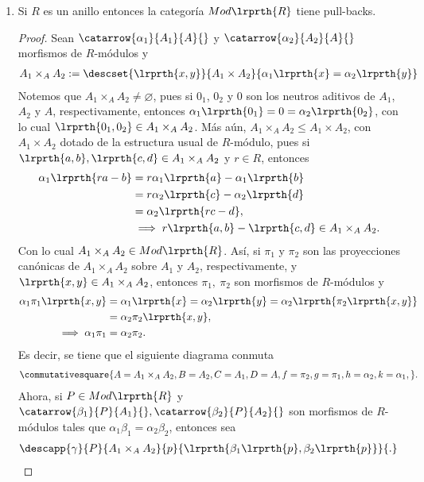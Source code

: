 \documentclass{article}
\begin{document}
\begin{enumerate}[label=\textbf{Ej \arabic*.}]
		\item Si $R$ es un anillo entonces la categoría $Mod\lrprth{R}$ tiene pull-backs.
		\begin{proof}
			Sean $\catarrow{\alpha_1}{A_1}{A}{}$ y $\catarrow{\alpha_2}{A_2}{A}{}$ morfismos de $R$-módulos y
			\begin{align*}
				A_1\times_{A} A_2:=\descset{\lrprth{x,y}}{A_1\times A_2}{\alpha_1\lrprth{x}=\alpha_2\lrprth{y}}
			\end{align*}
			\renewcommand{\copyandpaste}{A_1\times_{A} A_2}
			Notemos que $\copyandpaste\neq\varnothing$, pues si $0_1$, $0_2$ y $0$ son los neutros aditivos de $A_1$, $A_2$ y $A$, respectivamente, entonces $\alpha_1\lrprth{0_1}=0=\alpha_2\lrprth{0_2}$, con lo cual $\lrprth{0_1,0_2}\in\copyandpaste$. Más aún, $\copyandpaste\leq A_1\times A_2$, con $A_1\times A_2$ dotado de la estructura usual de $R$-módulo, pues si $\lrprth{a,b},\lrprth{c,d}\in\copyandpaste$ y $r\in R$, entonces
			\begin{align*}
				\alpha_1\lrprth{ra-b}&=r\alpha_1\lrprth{a}-\alpha_1\lrprth{b}\\
				&=r\alpha_2\lrprth{c}-\alpha_2\lrprth{d}\\
				&=\alpha_2\lrprth{rc-d},\\
				&\implies r\lrprth{a,b}-\lrprth{c,d}\in\copyandpaste.
			\end{align*}
			Con lo cual $\copyandpaste\in Mod\lrprth{R}$. Así, si $\pi_1$ y $\pi_2$ son las proyecciones canónicas de $\copyandpaste$ sobre $A_1$ y $A_2$, respectivamente, y $\lrprth{x,y}\in\copyandpaste$, entonces $\pi_1,\ \pi_2$ son morfismos de $R$-módulos y 
			\begin{align*}
				\alpha_1\pi_1\lrprth{x,y}&=\alpha_1\lrprth{x}=\alpha_2\lrprth{y}=\alpha_2\lrprth{\pi_2\lrprth{x,y}}\\
				&=\alpha_2\pi_2\lrprth{x,y},\\
				\implies \alpha_1\pi_1&=\alpha_2\pi_2.
			\end{align*}
			Es decir, se tiene que el siguiente diagrama conmuta
			\begin{align*}
				\commutativesquare{A=\copyandpaste,B=A_2,C=A_1,D=A,f=\pi_2,g=\pi_1,h=\alpha_2,k=\alpha_1,}.
			\end{align*}
			Ahora, si $P\in Mod\lrprth{R}$ y $\catarrow{\beta_1}{P}{A_1}{},\catarrow{\beta_2}{P}{A_2}{}$ son morfismos de $R$-módulos tales que $\alpha_1\beta_1=\alpha_2\beta_2$, entonces sea
			\begin{align*}
				\descapp{\gamma}{P}{\copyandpaste}{p}{\lrprth{\beta_1\lrprth{p},\beta_2\lrprth{p}}}{.}

\end{align*}
\end{proof}
\end{enumerate}
\end{document}
